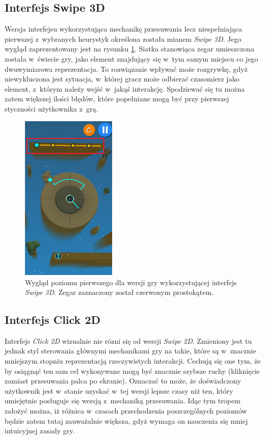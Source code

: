 \documentclass[a4paper,12pt,numbers=noenddot]{report}
\begin{document}
\subsection{Interfejs Swipe 3D}
Wersja interfejsu wykorzystująca mechanikę przesuwania lecz niespełniająca pierwszej z~wybranych heurystyk określona została mianem \textit{Swipe 3D}. Jego wygląd zaprezentowany jest na rysunku \ref{fig:interface_Swipe_3d}. Siatka stanowiąca zegar umieszczona została w~świecie gry, jako element znajdujący się w~tym samym miejscu co jego dwuwymiarowa reprezentacja. To rozwiązanie wpływać może rozgrywkę, gdyż niewykluczona jest sytuacja, w~której gracz może odbierać czasomierz jako element, z~którym  należy wejść w~jakąś interakcję. Spodziewać się tu można zatem większej ilości błędów, które popełniane mogą być przy pierwszej styczności użytkownika z~grą.
\begin{figure}[h!]
	\centering
  	\includegraphics[height=8cm]{fig/timer_3d.jpg}
	\caption{Wygląd poziomu pierwszego dla wersji gry wykorzystującej interfejs \textit{Swipe 3D}. Zegar zaznaczony został czerwonym prostokątem.}
	\label{fig:interface_Swipe_3d}
\end{figure}
\subsection{Interfejs Click 2D}
Interfejs \textit{Click 2D} wizualnie nie rózni się od wersji \textit{Swipe 2D}. Zmieniony jest tu jednak styl sterowania głównymi mechanikami gry na takie, które są w~znacznie mniejszym stopniu reprezentacją rzeczywistych interakcji. Cechują się one tym, że by osiągnąć ten sam cel wykonywane mogą być znacznie szybsze ruchy (kliknięcie zamiast przesuwania palca po ekranie). Oznaczać to może, że doświadczony użytkownik jest w~stanie uzyskać w~tej wersji lepsze czasy niż ten, który umiejętnie posługuje się wersją z~mechaniką przesuwania. Idąc tym tropem założyć można, iż różnica w~czasach przechodzenia poszczególnych poziomów będzie zatem tutaj zauważalnie większa, gdyż wymaga on nauczenia się mniej intuicyjnej zasady gry.
\end{document}
